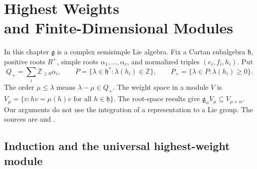 \chapter[Highest Weights and Finite-Dimensional Modules]{Highest Weights\\and Finite-Dimensional Modules}
\label{ch:highest-weights}

In this chapter \(\mathfrak g\) is a complex semisimple Lie algebra.
Fix a Cartan subalgebra \(\mathfrak h\), positive roots \(R^+\),
simple roots \(\alpha_1,\ldots,\alpha_r\), and normalized triples
\((e_i,f_i,h_i)\). Put
\[
 Q_+=\sum_i\mathbb Z_{\geq0}\alpha_i,\qquad
 P=\{\lambda\in\mathfrak h^*:\lambda(h_i)\in\mathbb Z\},\qquad
 P_+=\{\lambda\in P:\lambda(h_i)\geq0\}.
\]
The order \(\mu\leq\lambda\) means \(\lambda-\mu\in Q_+\).
The weight space in a module \(V\) is
\(V_\mu=\{v:hv=\mu(h)v\text{ for all }h\in\mathfrak h\}\).
The root-space results give
\(\mathfrak g_\alpha V_\mu\subseteq V_{\mu+\alpha}\).
Our arguments do not use the integration of a representation to a
Lie group. The sources are \cite[Sections 20--21]{humphreys} and
\cite[Section 25]{etingof}.

\section{Induction and the universal highest-weight module}

